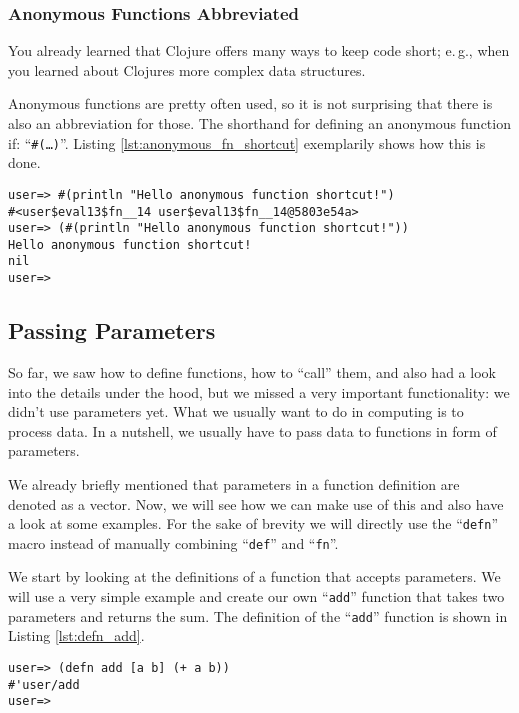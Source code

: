 \subsubsection{Anonymous Functions Abbreviated}
You already learned that Clojure offers many ways to keep code short;
e.\,g., when you learned about Clojures more complex data structures.

Anonymous functions are pretty often used, so it is not surprising that there is also an abbreviation for those.
The shorthand for defining an anonymous function if: ``\texttt{\#(\ldots)}''.
Listing \vref{lst:anonymous_fn_shortcut} exemplarily shows how this is done.

\begin{lstlisting}[label=lst:anonymous_fn_shortcut, caption=Shortcut for Creating Anonymous Functions]
user=> #(println "Hello anonymous function shortcut!")
#<user$eval13$fn__14 user$eval13$fn__14@5803e54a>
user=> (#(println "Hello anonymous function shortcut!"))
Hello anonymous function shortcut!
nil
user=>  
\end{lstlisting}

\subsection{Passing Parameters}
So far, we saw how to define functions, how to ``call'' them, and also had a look into the details under the hood, but we missed a very important functionality: 
we didn't use parameters yet.
What we usually want to do in computing is to process data.
In a nutshell, we usually have to pass data to functions in form of parameters.

We already briefly mentioned that parameters in a function definition are denoted as a vector.
Now, we will see how we can make use of this and also have a look at some examples.
For the sake of brevity we will directly use the ``\texttt{defn}'' macro instead of manually combining ``\texttt{def}'' and ``\texttt{fn}''.

We start by looking at the definitions of a function that accepts parameters.
We will use a very simple example and create our own ``\texttt{add}'' function that takes two parameters and returns the sum.
The definition of the ``\texttt{add}'' function is shown in Listing \vref{lst:defn_add}.

\begin{lstlisting}[label=lst:defn_add, caption=Defining a Function with Parameters]
user=> (defn add [a b] (+ a b))
#'user/add
user=>  
\end{lstlisting}


